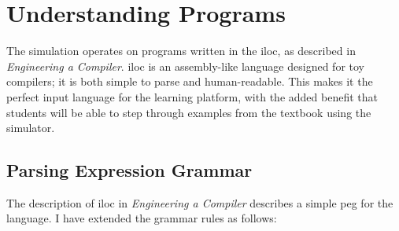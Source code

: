\documentclass[bsc,twoside,singlespacing,parskip,logo,notimes,normalheadings]{infthesis}
\begin{document}
    \section{Understanding Programs}
    The simulation operates on programs written in the \gls{iloc}, as
    described in {\em Engineering a
      Compiler}\cite[appx.~A]{eac}. \gls{iloc} is an assembly-like
    language designed for toy compilers; it is both simple to parse
    and human-readable. This makes it the perfect input language for
    the learning platform, with the added benefit that students will
    be able to step through examples from the textbook using the
    simulator.

        \subsection{Parsing Expression Grammar}
        The description of \gls{iloc} in {\em Engineering a Compiler}
        describes a simple \gls{peg} for the language. I have extended
        the grammar rules as follows:
\end{document}
